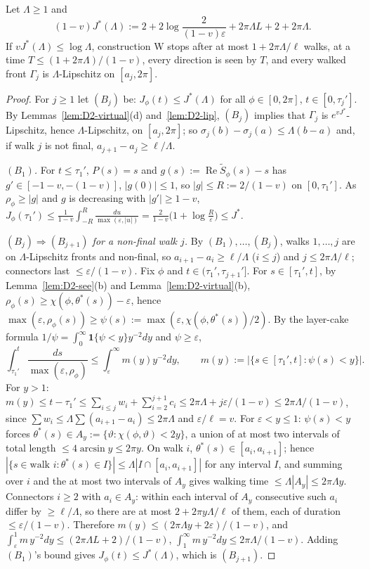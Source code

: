 \begin{lemma}\label{lem:D2-time}
Let $\Lambda\ge1$ and
\[
(1-v)J^*(\Lambda):=2+2\log\frac{2}{(1-v)\varepsilon}+2\pi\Lambda L+2+2\pi\Lambda .
\]
If $vJ^*(\Lambda)\le\log\Lambda$, construction W stops after at most $1+2\pi\Lambda/\ell$ walks, at a time
$T\le(1+2\pi\Lambda)/(1-v)$, every direction is seen by $T$, and every walked front $\Gamma_j$ is $\Lambda$-Lipschitz on $[a_j,2\pi]$.
\end{lemma}
\begin{proof}
For $j\ge1$ let $(B_j)$ be: $J_\phi(t)\le J^*(\Lambda)$ for all $\phi\in[0,2\pi]$, $t\in[0,\tau_j']$. By
Lemmas~\ref{lem:D2-virtual}(d) and~\ref{lem:D2-lip}, $(B_j)$ implies that $\Gamma_j$ is $e^{vJ^*}$-Lipschitz, hence
$\Lambda$-Lipschitz, on $[a_j,2\pi]$; so $\sigma_j(b)-\sigma_j(a)\le\Lambda(b-a)$ and, if walk $j$ is not final,
$a_{j+1}-a_j\ge\ell/\Lambda$.

\emph{$(B_1)$.} For $t\le\tau_1'$, $P(s)=s$ and $g(s):=\operatorname{Re}\tilde S_\phi(s)-s$ has $g'\in[-1-v,-(1-v)]$, $|g(0)|\le1$, so
$|g|\le R:=2/(1-v)$ on $[0,\tau_1']$. As $\rho_\phi\ge|g|$ and $g$ is decreasing with $|g'|\ge1-v$,
$J_\phi(\tau_1')\le\frac1{1-v}\int_{-R}^R\frac{du}{\max(\varepsilon,|u|)}=\frac{2}{1-v}\bigl(1+\log\frac R\varepsilon\bigr)\le J^*$.

\emph{$(B_j)\Rightarrow(B_{j+1})$ for a non-final walk $j$.} By $(B_1),\dots,(B_j)$, walks $1,\dots,j$ are on $\Lambda$-Lipschitz fronts
and non-final, so $a_{i+1}-a_i\ge\ell/\Lambda$ ($i\le j$) and $j\le2\pi\Lambda/\ell$; connectors last $\le\varepsilon/(1-v)$. Fix $\phi$
and $t\in(\tau_1',\tau_{j+1}']$. For $s\in[\tau_1',t]$, by Lemma~\ref{lem:D2-see}(b) and Lemma~\ref{lem:D2-virtual}(b),
$\rho_\phi(s)\ge\chi(\phi,\theta^*(s))-\varepsilon$, hence $\max(\varepsilon,\rho_\phi(s))\ge\psi(s):=\max(\varepsilon,\chi(\phi,\theta^*(s))/2)$.
By the layer-cake formula $1/\psi=\int_0^\infty\mathbf 1\{\psi<y\}y^{-2}dy$ and $\psi\ge\varepsilon$,
\[
\int_{\tau_1'}^t\frac{ds}{\max(\varepsilon,\rho_\phi)}\le\int_\varepsilon^\infty m(y)y^{-2}dy,\qquad m(y):=|\{s\in[\tau_1',t]:\psi(s)<y\}|.
\]
For $y>1$: $m(y)\le t-\tau_1'\le\sum_{i\le j}w_i+\sum_{i=2}^{j+1}c_i\le2\pi\Lambda+j\varepsilon/(1-v)\le2\pi\Lambda/(1-v)$, since
$\sum w_i\le\Lambda\sum(a_{i+1}-a_i)\le2\pi\Lambda$ and $\varepsilon/\ell=v$. For $\varepsilon<y\le1$: $\psi(s)<y$ forces
$\theta^*(s)\in A_y:=\{\vartheta:\chi(\phi,\vartheta)<2y\}$, a union of at most two intervals of total length $\le4\arcsin y\le2\pi y$.
On walk $i$, $\theta^*(s)\in[a_i,a_{i+1}]$; hence $|\{s\in\text{walk }i:\theta^*(s)\in I\}|\le\Lambda|I\cap[a_i,a_{i+1}]|$ for any interval
$I$, and summing over $i$ and the at most two intervals of $A_y$ gives walking time $\le\Lambda|A_y|\le2\pi\Lambda y$. Connectors $i\ge2$
with $a_i\in A_y$: within each interval of $A_y$ consecutive such $a_i$ differ by $\ge\ell/\Lambda$, so there are at most
$2+2\pi y\Lambda/\ell$ of them, each of duration $\le\varepsilon/(1-v)$. Therefore $m(y)\le(2\pi\Lambda y+2\varepsilon)/(1-v)$, and
$\int_\varepsilon^1m\,y^{-2}dy\le(2\pi\Lambda L+2)/(1-v)$, $\int_1^\infty m\,y^{-2}dy\le2\pi\Lambda/(1-v)$. Adding $(B_1)$'s bound gives
$J_\phi(t)\le J^*(\Lambda)$, which is $(B_{j+1})$.


\end{proof}
